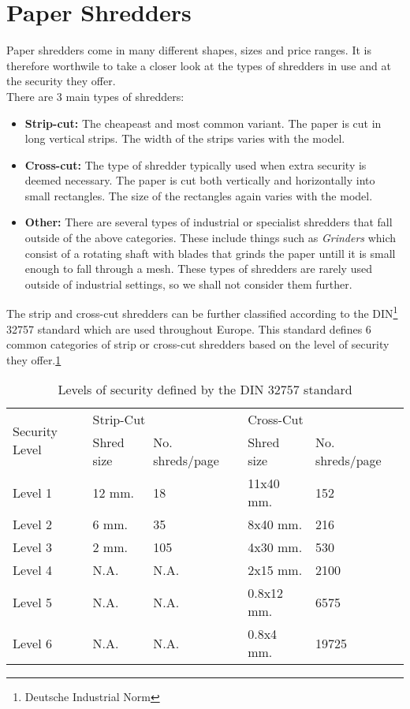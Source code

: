 \section{Paper Shredders}
Paper shredders come in many different shapes, sizes and price ranges. It is therefore worthwile to take a closer look at the types of shredders in use and at the security they offer. \\
There are 3 main types of shredders:
\begin{itemize}
\item {\bf Strip-cut:} The cheapeast and most common variant. The paper is cut in long vertical strips. The width of the strips varies with the model.
\item {\bf Cross-cut:} The type of shredder typically used when extra security is deemed necessary. The paper is cut both vertically and horizontally into small rectangles. The size of the rectangles again varies with the model.
\item {\bf Other:} There are several types of industrial or specialist shredders that fall outside of the above categories. These include things such as \emph{Grinders} which consist of a rotating shaft with blades that grinds the paper untill it is small enough to fall through a mesh. These types of shredders are rarely used outside of industrial settings, so we shall not consider them further.
\end{itemize}

The strip and cross-cut shredders can be further classified according to the DIN\footnote{Deutsche Industrial Norm} 32757 standard which are used throughout Europe. \cite{P16} This standard defines 6 common categories of strip or cross-cut shredders based on the level of security they offer.\ref{tab:din}

\begin{table}[h]
  \centering
  \begin{tabular}{lllll}
    \toprule
    \multirow{2}{*}{Security Level} & \multicolumn{2}{l}{Strip-Cut} & \multicolumn{2}{l}{Cross-Cut} \\
    \cmidrule(r){2-3} 
    \cmidrule(r){4-5}
    & Shred size & No. shreds/page & Shred size & No. shreds/page \\
    Level 1 & 12 mm. & 18 & 11x40 mm. & 152 \\
    Level 2 & 6 mm. & 35 & 8x40 mm. & 216 \\
    Level 3 & 2 mm. & 105 & 4x30 mm. & 530 \\
    Level 4 & N.A. & N.A. & 2x15 mm. & 2100 \\
    Level 5 & N.A. & N.A. & 0.8x12 mm. & 6575 \\
    Level 6 & N.A. & N.A. & 0.8x4 mm. & 19725 \\
    \bottomrule
  \end{tabular}
  \caption{Levels of security defined by the DIN 32757 standard}
  \label{tab:din}
\end{table}

